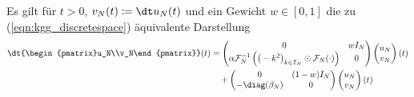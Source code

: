 Es gilt für $t>0$, $v_N(t)\coloneqq \dt u_N(t)$ und ein Gewicht $w\in [0,1]$ die zu (\ref{eqn:kgg_discretespace}) äquivalente Darstellung
\begin{align}
\label{eqn:kgg_discrete_first_order_part1}
\dt{\begin{pmatrix}u_N\\v_N\end{pmatrix}}(t)&=
\begin{pmatrix}0 & wI_N\\ \alpha\mathcal{F}_N^{-1}\left(\big(-k^2\big)_{k\in\mathcal{I}_N}\odot\mathcal{F}_N (\cdot )\right) & 0\end{pmatrix}
\begin{pmatrix}u_N\\v_N\end{pmatrix}(t)\\
\label{eqn:kgg_discrete_first_order_part2}
&\quad+\begin{pmatrix}0 & (1-w)I_N\\ -\diag({\beta_N}) & 0\end{pmatrix}
\begin{pmatrix}u_N\\v_N\end{pmatrix}(t)
\end{align}
